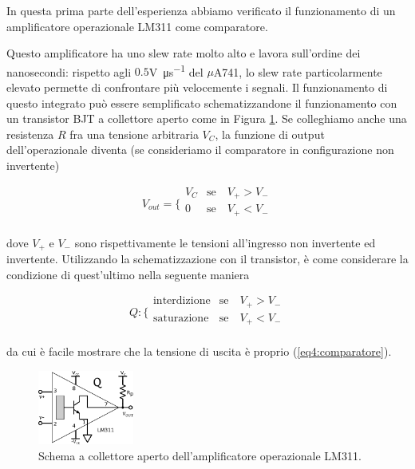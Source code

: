 In questa prima parte dell'esperienza abbiamo verificato il funzionamento di un amplificatore operazionale LM311 come comparatore.

Questo amplificatore ha uno slew rate molto alto e lavora sull'ordine dei nanosecondi: rispetto agli $0.5$\si{\volt\per\micro\second} del $\mu$A741, lo slew rate particolarmente elevato permette di confrontare più velocemente i segnali.
Il funzionamento di questo integrato può essere semplificato schematizzandone il funzionamento con un transistor BJT a collettore aperto come in Figura \ref{cir4:open_collector}.
Se colleghiamo anche una resistenza $R$ fra una tensione arbitraria $V_C$, la funzione di output dell'operazionale diventa (se consideriamo il comparatore in configurazione non invertente)

\begin{equation}
V_{out} = \bigg \{
\begin{array}{rl}
V_C & \mathrm{se} \quad V_+ > V_- \\
0 & \mathrm{se} \quad V_+ < V_- \\
\end{array}
\label{eq4:comparatore}
\end{equation}

dove $V_+$ e $V_-$ sono rispettivamente le tensioni all'ingresso non invertente ed invertente. Utilizzando la schematizzazione con il transistor, è come considerare la condizione di quest'ultimo nella seguente maniera

\begin{equation}
Q : \bigg \{
\begin{array}{rl}
\mathrm{interdizione} & \mathrm{se} \quad V_+ > V_- \\
\mathrm{saturazione} & \mathrm{se} \quad V_+ < V_- \\
\end{array}
\label{eq4:comparatore_Q}
\end{equation}

da cui è facile mostrare che la tensione di uscita è proprio (\ref{eq4:comparatore}).

\begin{figure}
  \begin{center}
    \includegraphics[width=0.280\textwidth]{../E04/latex/c_LM311.pdf}
  \end{center}
  \caption{Schema a collettore aperto dell'amplificatore operazionale LM311.}
  \label{cir4:open_collector}
\end{figure}

